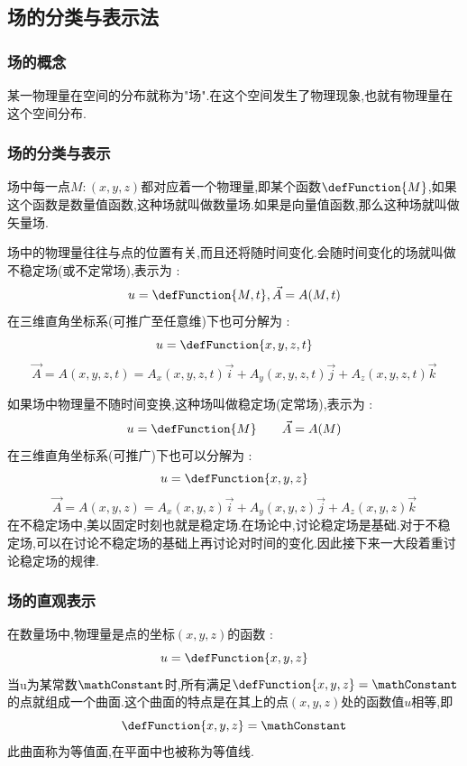 {{{  }%

  \subsection{场的分类与表示法}{

    \subsubsection{场的概念}{
      某一物理量在空间的分布就称为"场".在这个空间发生了物理现象,也就有物理量在这个空间分布.
    }%

    \subsubsection{场的分类与表示}{
      场中每一点$M:(x,y,z)$都对应着一个物理量,即某个函数$\defFunction{M}$,如果这个函数是数量值函数,这种场就叫做数量场.如果是向量值函数,那么这种场就叫做矢量场.

      场中的物理量往往与点的位置有关,而且还将随时间变化.会随时间变化的场就叫做不稳定场(或不定常场),表示为 :
      $$
        u= \defFunction{M,t},\vec{A} = A(M,t)
      $$
      在三维直角坐标系(可推广至任意维)下也可分解为 :
      $$
        u = \defFunction{x,y,z,t}
      $$
      $$
        \vec{A} = A(x,y,z,t) = A_x(x,y,z,t)\vec{i} + A_y(x,y,z,t)\vec{j} + A_z(x,y,z,t)\vec{k}
      $$\spaceline

      如果场中物理量不随时间变换,这种场叫做稳定场(定常场),表示为 :
      $$
        u= \defFunction{M}\qquad \vec{A} = A(M)
      $$
      在三维直角坐标系(可推广)下也可以分解为 :
      $$
        u= \defFunction{x,y,z}
      $$
      $$
        \vec{A} = A(x,y,z) = A_x(x,y,z)\vec{i} + A_y(x,y,z)\vec{j} + A_z(x,y,z)\vec{k}
      $$
      在不稳定场中,美以固定时刻也就是稳定场.在场论中,讨论稳定场是基础.对于不稳定场,可以在讨论不稳定场的基础上再讨论对时间的变化.因此接下来一大段着重讨论稳定场的规律.
    }%

    \subsubsection{场的直观表示}{
      在数量场中,物理量是点的坐标$(x,y,z)$的函数 :
      $$
        u = \defFunction{x,y,z}
      $$
      当u为某常数$\mathConstant$时,所有满足$\defFunction{x,y,z} = \mathConstant$的点就组成一个曲面.这个曲面的特点是在其上的点$(x,y,z)$处的函数值$u$相等,即
      $$
        \defFunction{x,y,z} = \mathConstant
      $$
      此曲面称为等值面,在平面中也被称为等值线.

}}}}
